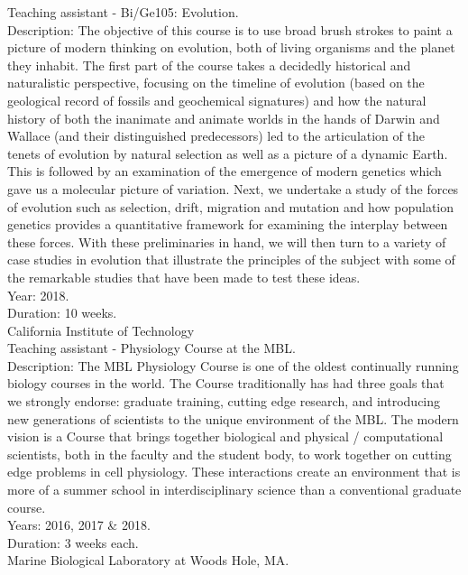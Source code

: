 \documentclass[]{friggeri-cv}
\begin{document}
Teaching assistant - Bi/Ge105: Evolution.\\
Description: The objective of this course is to use broad brush strokes to paint a picture of modern thinking on evolution, both of living organisms and the planet they inhabit. The first part of the course takes a decidedly historical and naturalistic perspective, focusing on the timeline of evolution (based on the geological record of fossils and geochemical signatures) and how the natural history of both the inanimate and animate worlds in the hands of Darwin and Wallace (and their distinguished predecessors) led to the articulation of the tenets of evolution by natural selection as well as a picture of a dynamic Earth. This is followed by an examination of the emergence of modern genetics which gave us a molecular picture of variation. Next, we undertake a study of the forces of evolution such as selection, drift, migration and mutation and how population genetics provides a quantitative framework for examining the interplay between these forces. With these preliminaries in hand, we will then turn to a variety of case studies in evolution that illustrate the principles of the subject with some of the remarkable studies that have been made to test these ideas.\\
Year: 2018.\\
Duration: 10 weeks.\\
{California Institute of Technology}\\

Teaching assistant - Physiology Course at the MBL.\\
Description: The MBL Physiology Course is one of the oldest continually running biology courses in the world. The Course traditionally has had three goals that we strongly endorse: graduate training, cutting edge research, and introducing new generations of scientists to the unique environment of the MBL. The modern vision is a Course that brings together biological and physical / computational scientists, both in the faculty and the student body, to work together on cutting edge problems in cell physiology. These interactions create an environment that is more of a summer school in interdisciplinary science than a conventional graduate course.\\
Years: 2016, 2017 \& 2018.\\
Duration: 3 weeks each.\\
{Marine Biological Laboratory at Woods Hole, MA.}\\
\end{document}
